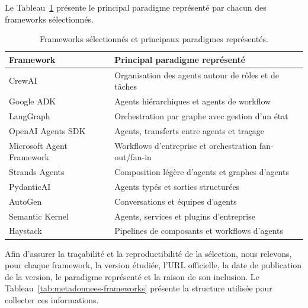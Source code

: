 Le Tableau~\ref{tab:frameworks-selectionnes} présente le principal
paradigme représenté par chacun des frameworks sélectionnés.

\begin{table}[t]
    \centering
    \caption{Frameworks sélectionnés et principaux paradigmes représentés.}
    \label{tab:frameworks-selectionnes}
    \small
    \begin{tabularx}{\columnwidth}{@{}p{}>{\raggedright\arraybackslash}X@{}}
        \toprule
        \textbf{Framework} & \textbf{Principal paradigme représenté} \\
        \midrule
        CrewAI & Organisation des agents autour de rôles et de tâches \\
        Google ADK & Agents hiérarchiques et agents de workflow \\
        LangGraph & Orchestration par graphe avec gestion d'un état \\
        OpenAI Agents SDK & Agents, transferts entre agents et traçage \\
        Microsoft Agent Framework & Workflows d'entreprise et orchestration fan-out/fan-in \\
        Strands Agents & Composition légère d'agents et graphes d'agents \\
        PydanticAI & Agents typés et sorties structurées \\
        AutoGen & Conversations et équipes d'agents \\
        Semantic Kernel & Agents, services et plugins d'entreprise \\
        Haystack & Pipelines de composants et workflows d'agents \\
        \bottomrule
    \end{tabularx}
\end{table}

Afin d'assurer la traçabilité et la reproductibilité de la sélection,
nous relevons, pour chaque framework, la version étudiée, l'URL
officielle, la date de publication de la version, le paradigme
représenté et la raison de son inclusion. Le
Tableau~\ref{tab:metadonnees-frameworks} présente la structure utilisée
pour collecter ces informations.

